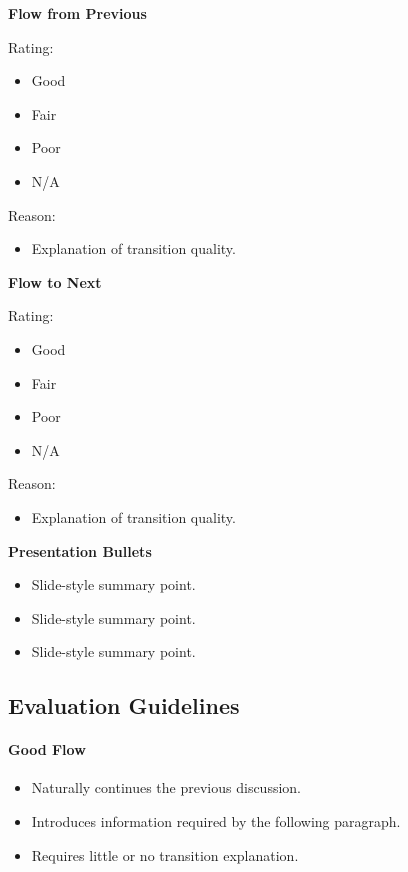 \textbf{Flow from Previous}

Rating:
\begin{itemize}
\item Good
\item Fair
\item Poor
\item N/A
\end{itemize}

Reason:
\begin{itemize}
\item Explanation of transition quality.
\end{itemize}

\textbf{Flow to Next}

Rating:
\begin{itemize}
\item Good
\item Fair
\item Poor
\item N/A
\end{itemize}

Reason:
\begin{itemize}
\item Explanation of transition quality.
\end{itemize}

\textbf{Presentation Bullets}
\begin{itemize}
\item Slide-style summary point.
\item Slide-style summary point.
\item Slide-style summary point.
\end{itemize}

\subsection{Evaluation Guidelines}

\paragraph{Good Flow}

\begin{itemize}
\item Naturally continues the previous discussion.
\item Introduces information required by the following paragraph.
\item Requires little or no transition explanation.
\end{itemize}

